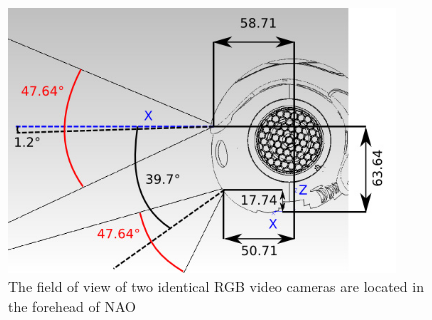 \begin{figure}
	[h] \centering 
	\includegraphics[height=7cm]{figures/content/nao-vision.jpg} \caption{The field of view of two identical RGB video cameras are located in the forehead of NAO \cite{nao-spec} } \label{fg:nao:vision} 
\end{figure}
